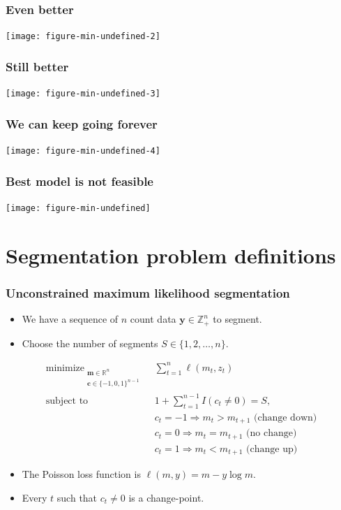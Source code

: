 \documentclass{beamer}
\DeclareMathOperator*{\minimize}{minimize}
\newcommand{\RR}{\mathbb R}
\newcommand{\ZZ}{\mathbb Z}
\begin{document}
\begin{frame}
  \frametitle{Even better}
  \texttt{[image: figure-min-undefined-2]}
\end{frame}

\begin{frame}
  \frametitle{Still better}
  \texttt{[image: figure-min-undefined-3]}
\end{frame}

\begin{frame}
  \frametitle{We can keep going forever}
  \texttt{[image: figure-min-undefined-4]}
\end{frame}

\begin{frame}
  \frametitle{Best model is not feasible}
  \texttt{[image: figure-min-undefined]}
\end{frame}

\section*{Segmentation problem definitions}

\begin{frame}
  \frametitle{Unconstrained maximum likelihood segmentation}
  \begin{itemize}
  \item We have a sequence of $n$ count data $\mathbf y\in\ZZ_+^n$ to
    segment. 
  \item Choose the number of segments $S\in\{1, 2, \dots, n\}$.
  \end{itemize}
\begin{align*}
  \minimize_{\substack{
  \mathbf m\in\RR^{n}
\\
  \mathbf c\in\{-1,0,1\}^{n-1}
  }} &\ \ 
    \sum_{t=1}^n \ell( m_t,  z_t) 
\\
    \text{subject to} &\ \  1+\sum_{t=1}^{n-1} I(c_t \neq 0) = S, 
\nonumber\\
& \ \ c_t = -1 \Rightarrow m_{t} > m_{t+1} \text{ (change down)}
\nonumber\\
& \ \ c_t = 0 \Rightarrow m_{t} = m_{t+1}  \text{ (no change)}
\nonumber\\
& \ \ c_t = 1 \Rightarrow m_{t} < m_{t+1} \text{ (change up)}
\nonumber
\end{align*}
\begin{itemize}
\item The Poisson loss function is  $\ell( m,  y)= m - y \log m$.
\item Every $t$ such that $c_t \neq 0$ is a
change-point.
\end{itemize}

\end{frame}
\end{document}

